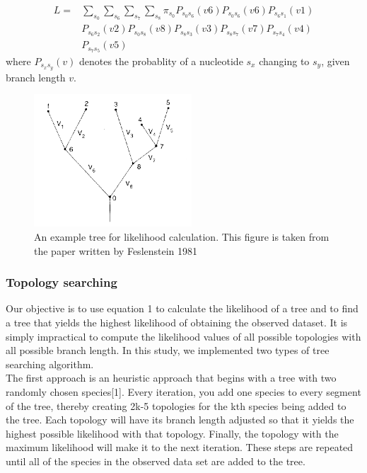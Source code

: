 \documentclass[10pt,twocolumn]{article}
\begin{document}
\begin{align*}
L = & \sum\limits_{s_0}  \sum\limits_{s_6}  \sum\limits_{s_7}  \sum\limits_{s_8} \pi_{s_0} P_{s_0 s_6}(v6) P_{s_0 s_6}(v6) P_{s_6 s_1}(v1) 
\\ & P_{s_6 s_2}(v2) P_{s_0 s_8}(v8) P_{s_8 s_3}(v3) P_{s_8 s_7}(v7) P_{s_7 s_4}(v4)
\\ & P_{s_7 s_5}(v5)
\end{align*}
where $P_{s_x s_y}(v)$ denotes the probablity of a nucleotide $s_x$ changing to $s_y$, given branch length $v$.

\begin{figure}
\begin{centering}
  \includegraphics{media//ml.png}
  \caption{An example tree for likelihood calculation. This figure is taken from the paper written by Feslenstein 1981}
  \label{fig:ml}
\end{centering}
\end{figure}

\subsubsection*{Topology searching}
Our objective is to use equation 1 to calculate the likelihood of a tree and to find a tree that yields the highest likelihood of obtaining the observed dataset. It is simply impractical to compute the likelihood values of all possible topologies with all possible branch length. In this  study, we implemented two types of tree searching algorithm. \\

The first approach is an heuristic approach that begins with a tree with two randomly chosen species[1]. Every iteration, you add one species to every segment of the tree, thereby creating 2k-5 topologies for the kth species being added to the tree. Each topology will have its branch length adjusted so that it yields the highest possible likelihood with that topology. Finally, the topology with the maximum likelihood will make it to the next iteration. These steps are repeated until all of the species in the observed data set are added to the tree. \\
\end{document}
